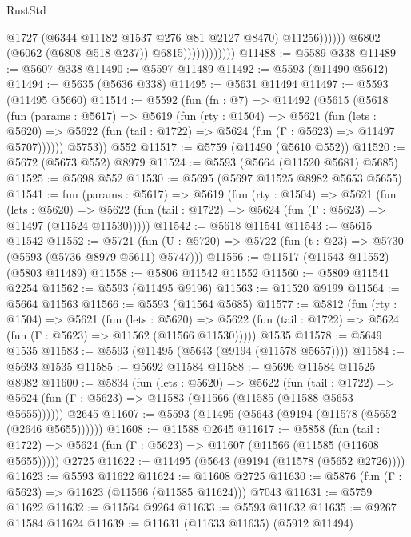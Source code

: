\begin{lexlean}{RustStd}
\begin{coremodule}
                                        @1727
                                        (@6344 @11182 @1537 @276 @81 @2127 @8470)
                                        @11256))))))
                            @6802
                            (@6062 (@6808 @518 @237))
                            @6815))))))))))))
@11488 := @5589 @338
@11489 := @5607 @338
@11490 := @5597 @11489
@11492 := @5593 (@11490 @5612)
@11494 := @5635 (@5636 @338)
@11495 := @5631 @11494
@11497 := @5593 (@11495 @5660)
@11514 := @5592
    (fun (fn : @7) =>
    @11492
      (@5615
        (@5618
          (fun (params : @5617) =>
          @5619
            (fun (rty : @1504) =>
            @5621
              (fun (lets : @5620) =>
              @5622 (fun (tail : @1722) => @5624 (fun (Γ : @5623) => @11497 @5707))))))
        @5753))
    @552
@11517 := @5759 (@11490 (@5610 @552))
@11520 := @5672 (@5673 @552) @8979
@11524 := @5593 (@5664 (@11520 @5681) @5685)
@11525 := @5698 @552
@11530 := @5695 (@5697 @11525 @8982 @5653 @5655)
@11541 := fun (params : @5617) =>
  @5619
    (fun (rty : @1504) =>
    @5621
      (fun (lets : @5620) =>
      @5622 (fun (tail : @1722) => @5624 (fun (Γ : @5623) => @11497 (@11524 @11530)))))
@11542 := @5618 @11541
@11543 := @5615 @11542
@11552 := @5721
    (fun (U : @5720) => @5722 (fun (t : @23) => @5730 (@5593 (@5736 @8979 @5611) @5747)))
@11556 := @11517 (@11543 @11552) (@5803 @11489)
@11558 := @5806 @11542 @11552
@11560 := @5809 @11541 @2254
@11562 := @5593 (@11495 @9196)
@11563 := @11520 @9199
@11564 := @5664 @11563
@11566 := @5593 (@11564 @5685)
@11577 := @5812
    (fun (rty : @1504) =>
    @5621
      (fun (lets : @5620) =>
      @5622 (fun (tail : @1722) => @5624 (fun (Γ : @5623) => @11562 (@11566 @11530)))))
    @1535
@11578 := @5649 @1535
@11583 := @5593 (@11495 (@5643 (@9194 (@11578 @5657))))
@11584 := @5693 @1535
@11585 := @5692 @11584
@11588 := @5696 @11584 @11525 @8982
@11600 := @5834
    (fun (lets : @5620) =>
    @5622
      (fun (tail : @1722) =>
      @5624 (fun (Γ : @5623) => @11583 (@11566 (@11585 (@11588 @5653 @5655))))))
    @2645
@11607 := @5593 (@11495 (@5643 (@9194 (@11578 (@5652 (@2646 @5655))))))
@11608 := @11588 @2645
@11617 := @5858
    (fun (tail : @1722) => @5624 (fun (Γ : @5623) => @11607 (@11566 (@11585 (@11608 @5655)))))
    @2725
@11622 := @11495 (@5643 (@9194 (@11578 (@5652 @2726))))
@11623 := @5593 @11622
@11624 := @11608 @2725
@11630 := @5876 (fun (Γ : @5623) => @11623 (@11566 (@11585 @11624))) @7043
@11631 := @5759 @11622
@11632 := @11564 @9264
@11633 := @5593 @11632
@11635 := @9267 @11584 @11624
@11639 := @11631 (@11633 @11635) (@5912 @11494)

\end{coremodule}
\end{lexlean}

